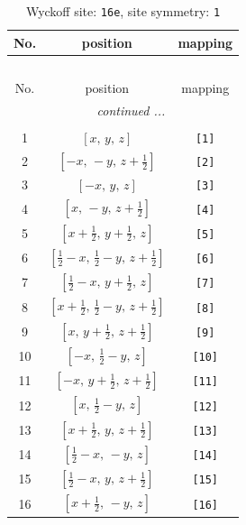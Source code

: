 \documentclass[fleqn,8pt]{jsarticle}
\begin{document}
\begin{longtable}{ccc}
\caption{Wyckoff site: {\tt 16e}, site symmetry: {\tt 1}}
 \\
 \hline \hline
No. & position & mapping \\ \hline \endfirsthead

\multicolumn{2}{l}{\tablename\ \thetable{}} \\
 \hline \hline
No. & position & mapping \\ \hline \endhead

 \hline \hline
\multicolumn{2}{r}{\footnotesize\it continued ...} \\ \endfoot

 \hline \hline
\multicolumn{2}{r}{} \\ \endlastfoot

1 & $\left[ x,\, y,\, z \right]$ & {\tt [1]} \\ \hline
2 & $\left[ - x,\, - y,\, z + \frac{1}{2} \right]$ & {\tt [2]} \\ \hline
3 & $\left[ - x,\, y,\, z \right]$ & {\tt [3]} \\ \hline
4 & $\left[ x,\, - y,\, z + \frac{1}{2} \right]$ & {\tt [4]} \\ \hline
5 & $\left[ x + \frac{1}{2},\, y + \frac{1}{2},\, z \right]$ & {\tt [5]} \\ \hline
6 & $\left[ \frac{1}{2} - x,\, \frac{1}{2} - y,\, z + \frac{1}{2} \right]$ & {\tt [6]} \\ \hline
7 & $\left[ \frac{1}{2} - x,\, y + \frac{1}{2},\, z \right]$ & {\tt [7]} \\ \hline
8 & $\left[ x + \frac{1}{2},\, \frac{1}{2} - y,\, z + \frac{1}{2} \right]$ & {\tt [8]} \\ \hline
9 & $\left[ x,\, y + \frac{1}{2},\, z + \frac{1}{2} \right]$ & {\tt [9]} \\ \hline
10 & $\left[ - x,\, \frac{1}{2} - y,\, z \right]$ & {\tt [10]} \\ \hline
11 & $\left[ - x,\, y + \frac{1}{2},\, z + \frac{1}{2} \right]$ & {\tt [11]} \\ \hline
12 & $\left[ x,\, \frac{1}{2} - y,\, z \right]$ & {\tt [12]} \\ \hline
13 & $\left[ x + \frac{1}{2},\, y,\, z + \frac{1}{2} \right]$ & {\tt [13]} \\ \hline
14 & $\left[ \frac{1}{2} - x,\, - y,\, z \right]$ & {\tt [14]} \\ \hline
15 & $\left[ \frac{1}{2} - x,\, y,\, z + \frac{1}{2} \right]$ & {\tt [15]} \\ \hline
16 & $\left[ x + \frac{1}{2},\, - y,\, z \right]$ & {\tt [16]} \\
\end{longtable}
\end{document}

